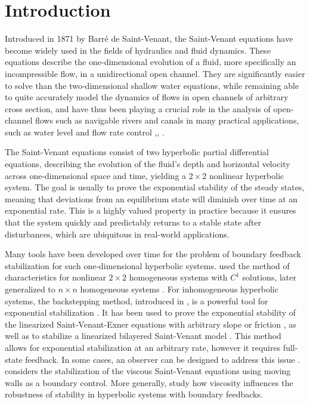 \documentclass[11pt]{article}
\begin{document}
\section{Introduction}

Introduced in 1871 by Barré de Saint-Venant, the Saint-Venant equations \cite{de1871theorie} have become widely used in the fields of hydraulics and fluid dynamics. These equations describe the one-dimensional evolution of a fluid, more specifically an incompressible flow, in a unidirectional open channel. They are significantly easier to solve than the two-dimensional shallow water equations, while remaining able to quite accurately model the dynamics of flows in open channels of arbitrary cross section, and have thus been playing a crucial role in the analysis of open-channel flows such as navigable rivers and canals in many practical applications, such as water level and flow rate control \cite{halleux2003boundary,gugat2003global,leugering2002modelling},{\cite{gugat2009global}}, \cite{gu2011exact,li2009exact,prieur2018boundary}. 

The Saint-Venant equations consist of two hyperbolic partial differential equations, describing the evolution of the fluid's depth and horizontal velocity across one-dimensional space and time, yielding a $2 \times 2$ nonlinear hyperbolic system. The goal is usually to prove the exponential stability of the steady states, meaning that deviations from an equilibrium state will diminish over time at an exponential rate. This is a highly valued property in practice because it ensures that the system quickly and predictably returns to a stable state after disturbances, which are ubiquitous in real-world applications.

Many tools have been developed over time for the problem of boundary feedback stabilization for such one-dimensional hyperbolic systems. \cite{GREENBERG198466} used the method of characteristics for nonlinear $2 \times 2$ homogeneous systems with $C^1$ solutions, later generalized to $n \times n$ homogeneous systems \cite{Qin}. For inhomogeneous hyperbolic systems, the backstepping method, introduced in \cite{doi:10.1137/1.9780898718607}, is a powerful tool for exponential stabilization \cite{KRSTIC2008750,6160338,Meglio2013StabilizationOA}. It has been used to prove the exponential stability of the linearized Saint-Venant-Exner equations with arbitrary slope or friction \cite{7402381}, as well as to stabilize a linearized bilayered Saint-Venant model \cite{DIAGNE2016130}. This method allows for exponential stabilization at an arbitrary rate, however it requires full-state feedback. In some cases, an observer can be designed to address this issue \cite{6160338,7402381,dimeglio:hal-01499940}. {\cite{arfaoui2011boundary} considers the stabilization of the viscous Saint-Venant equations using moving walls as a boundary control. More generally, \cite{bastin2023diffusion,bastin2025usefulness} study how viscosity influences the robustness of stability in hyperbolic systems with boundary feedbacks.}
\end{document}
